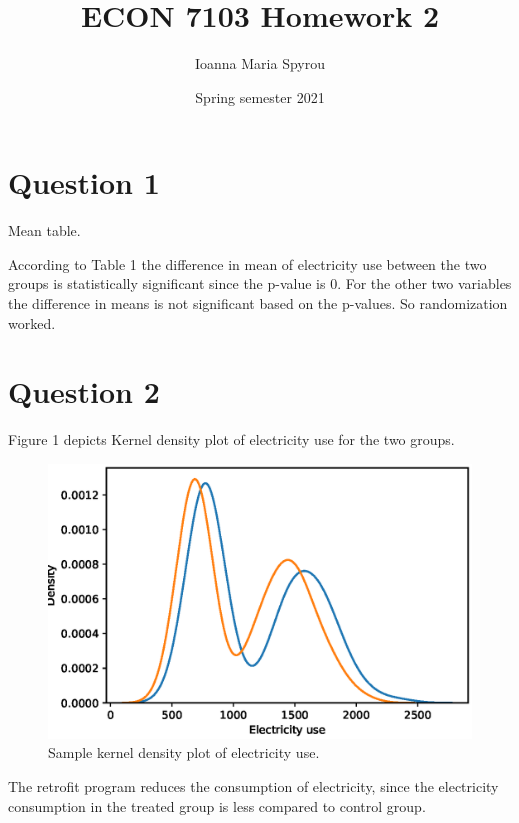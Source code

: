 \documentclass{article}
\title{ECON 7103 Homework 2}
\author{Ioanna Maria Spyrou}
\date{Spring semester 2021}
\begin{document}
  
\maketitle


\section{Question 1}

\begin{table}[h]
    \centering
    
    \caption{Mean table.}
    \label{tab:my_label}
\end{table}

According to Table 1 the difference in mean of electricity use between the two groups is statistically significant since the p-value is 0. For the other two variables the difference in means is not significant based on the p-values. So randomization worked.

\section{Question 2}
Figure 1 depicts Kernel density plot of electricity use for the two groups.

\begin{figure}[ht]
    \centering
    \includegraphics[scale = 0.7]{plot.eps}
    \caption{Sample kernel density plot of electricity use.}
    \label{fig:plot}
\end{figure}

The retrofit program reduces the consumption of electricity, since the electricity consumption in the treated group is less compared to control group.
\end{document}
